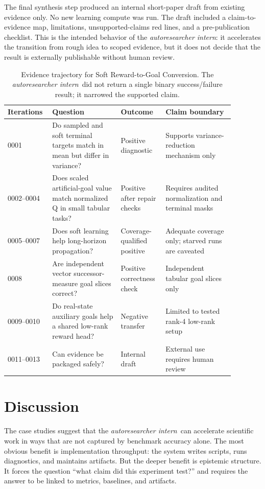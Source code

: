 \documentclass{article}
\newcommand{\intern}{\emph{autoresearcher intern}}
\begin{document}
The final synthesis step produced an internal short-paper draft from existing evidence only. No new learning compute was run. The draft included a claim-to-evidence map, limitations, unsupported-claims red lines, and a pre-publication checklist. This is the intended behavior of the \intern: it accelerates the transition from rough idea to scoped evidence, but it does not decide that the result is externally publishable without human review.

\begin{table}[t]
\centering
\small
\begin{tabular}{p{0.14\linewidth}p{0.28\linewidth}p{0.18\linewidth}p{0.28\linewidth}}
\toprule
Iterations & Question & Outcome & Claim boundary \\
\midrule
0001 & Do sampled and soft terminal targets match in mean but differ in variance? & Positive diagnostic & Supports variance-reduction mechanism only \\
0002--0004 & Does scaled artificial-goal value match normalized Q in small tabular tasks? & Positive after repair checks & Requires audited normalization and terminal masks \\
0005--0007 & Does soft learning help long-horizon propagation? & Coverage-qualified positive & Adequate coverage only; starved runs are caveated \\
0008 & Are independent vector successor-measure goal slices correct? & Positive correctness check & Independent tabular goal slices only \\
0009--0010 & Do real-state auxiliary goals help a shared low-rank reward head? & Negative transfer & Limited to tested rank-4 low-rank setup \\
0011--0013 & Can evidence be packaged safely? & Internal draft & External use requires human review \\
\bottomrule
\end{tabular}
\caption{Evidence trajectory for Soft Reward-to-Goal Conversion. The \intern\ did not return a single binary success/failure result; it narrowed the supported claim.}
\label{tab:rewardtrajectory}
\end{table}

\section{Discussion}

The case studies suggest that the \intern\ can accelerate scientific work in ways that are not captured by benchmark accuracy alone. The most obvious benefit is implementation throughput: the system writes scripts, runs diagnostics, and maintains artifacts. But the deeper benefit is epistemic structure. It forces the question ``what claim did this experiment test?'' and requires the answer to be linked to metrics, baselines, and artifacts.
\end{document}
